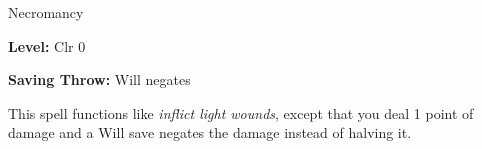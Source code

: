 
Necromancy

\textbf{Level:} Clr 0

\textbf{Saving Throw:} Will negates

This spell functions like \textit{inflict light wounds}, except that you deal 1 
point of damage and a Will save negates the damage instead of halving it.

